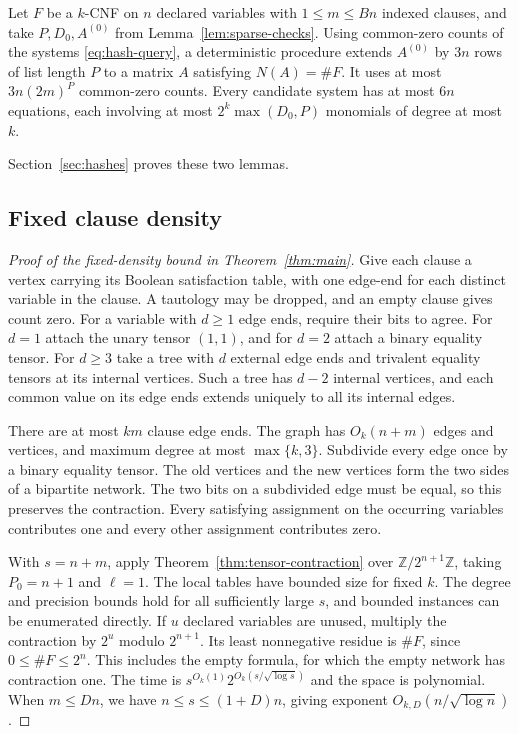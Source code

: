 \begin{lemma}\label{lem:greedy-hashes}
Let $F$ be a $k$-CNF on $n$ declared variables with $1\le m\le Bn$
indexed clauses, and take $P,D_0,A^{(0)}$ from
Lemma~\ref{lem:sparse-checks}. Using common-zero counts of the
systems \eqref{eq:hash-query}, a deterministic procedure extends
$A^{(0)}$ by $3n$ rows of list length $P$ to a matrix $A$ satisfying
$N(A)=\#F$. It uses at most $3n(2m)^P$
common-zero counts. Every candidate system has at most $6n$ equations,
each involving at most $2^k\max(D_0,P)$ monomials of degree at most $k$.
\end{lemma}
Section~\ref{sec:hashes} proves these two lemmas.

\subsection{Fixed clause density}\label{subsec:sharp-fixed-density}

\begin{proof}[Proof of the fixed-density bound in Theorem~\ref{thm:main}]
Give each clause a vertex carrying its Boolean satisfaction table, with
one edge-end for each distinct variable in the clause. A tautology may be
dropped, and an empty clause gives count zero. For a variable with
$d\ge1$ edge ends, require their bits to agree. For $d=1$ attach the unary
tensor $(1,1)$, and for $d=2$ attach a binary equality tensor. For
$d\ge3$ take a tree with $d$ external edge ends and trivalent equality
tensors at its internal vertices. Such a tree has $d-2$ internal
vertices, and each common value on its edge ends extends uniquely to all
its internal edges.

There are at most $km$ clause edge ends. The graph has $O_k(n+m)$ edges
and vertices, and maximum degree at most $\max\{k,3\}$. Subdivide
every edge once by a binary equality tensor. The old vertices and the
new vertices form the two sides of a bipartite network. The two bits
on a subdivided edge must be equal, so this preserves the contraction.
Every satisfying assignment on the occurring variables contributes
one and every other assignment contributes zero.

With $s=n+m$, apply Theorem~\ref{thm:tensor-contraction} over
$\mathbb Z/2^{n+1}\mathbb Z$, taking $P_0=n+1$ and $\ell=1$. The
local tables have bounded size for fixed $k$. The
degree and precision bounds hold for all sufficiently large $s$, and
bounded instances can be enumerated directly. If $u$ declared
variables are unused, multiply the contraction by $2^u$ modulo
$2^{n+1}$. Its least nonnegative residue is $\#F$, since
$0\le\#F\le2^n$. This includes the empty formula, for which the
empty network has contraction one. The time is
$s^{O_k(1)}2^{O_k(s/\sqrt{\log s})}$ and the space is polynomial.
When $m\le Dn$, we have $n\le s\le(1+D)n$, giving exponent
$O_{k,D}(n/\sqrt{\log n})$.
\end{proof}


